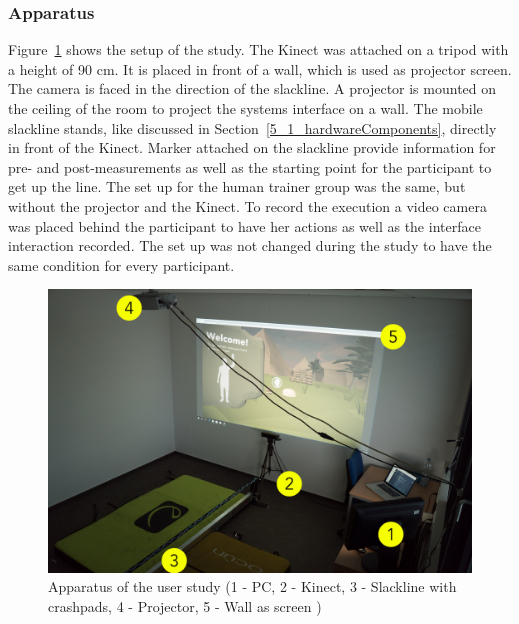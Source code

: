 \subsubsection{Apparatus}
Figure~\ref{fig:6_3_apparatus} shows the setup of the study.
The Kinect was attached on a tripod with a height of 90 cm.
It is placed in front of a wall, which is used as projector screen.
The camera is faced in the direction of the slackline.
A projector is mounted on the ceiling of the room to project the systems interface on a wall.
The mobile slackline stands, like discussed in Section~\ref{5_1_hardwareComponents}, directly in front of the Kinect.
Marker attached on the slackline provide information for pre- and post-measurements as well as the starting point for the participant to get up the line.
The set up for the human trainer group was the same, but without the projector and the Kinect.
To record the execution a video camera was placed behind the participant to have her actions as well as the interface interaction recorded.
The set up was not changed during the study to have the same condition for every participant.

\begin{figure}[htb]
	\centering
	\includegraphics[width=0.88\linewidth]{Pictures/6_3_apparatus}
	\caption{Apparatus of the user study (1 - PC, 2 - Kinect, 3 - Slackline with crashpads, 4 - Projector, 5 - Wall as screen	)}
	\label{fig:6_3_apparatus}
\end{figure}

